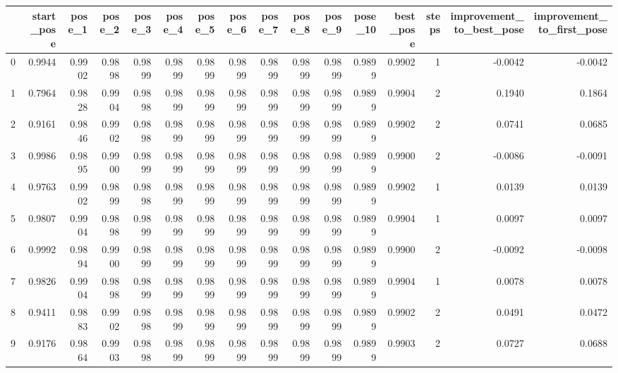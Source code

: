 \begin{tabular}{lrrrrrrrrrrrrrrr}
\toprule
{} &  start\_pose &  pose\_1 &  pose\_2 &  pose\_3 &  pose\_4 &  pose\_5 &  pose\_6 &  pose\_7 &  pose\_8 &  pose\_9 &  pose\_10 &  best\_pose &  steps &  improvement\_to\_best\_pose &  improvement\_to\_first\_pose \\
\midrule
0   &      0.9944 &  0.9902 &  0.9898 &  0.9899 &  0.9899 &  0.9899 &  0.9899 &  0.9899 &  0.9899 &  0.9899 &   0.9899 &     0.9902 &      1 &                   -0.0042 &                    -0.0042 \\
1   &      0.7964 &  0.9828 &  0.9904 &  0.9898 &  0.9899 &  0.9899 &  0.9899 &  0.9899 &  0.9899 &  0.9899 &   0.9899 &     0.9904 &      2 &                    0.1940 &                     0.1864 \\
2   &      0.9161 &  0.9846 &  0.9902 &  0.9898 &  0.9899 &  0.9899 &  0.9899 &  0.9899 &  0.9899 &  0.9899 &   0.9899 &     0.9902 &      2 &                    0.0741 &                     0.0685 \\
3   &      0.9986 &  0.9895 &  0.9900 &  0.9899 &  0.9899 &  0.9899 &  0.9899 &  0.9899 &  0.9899 &  0.9899 &   0.9899 &     0.9900 &      2 &                   -0.0086 &                    -0.0091 \\
4   &      0.9763 &  0.9902 &  0.9899 &  0.9898 &  0.9899 &  0.9899 &  0.9899 &  0.9899 &  0.9899 &  0.9899 &   0.9899 &     0.9902 &      1 &                    0.0139 &                     0.0139 \\
5   &      0.9807 &  0.9904 &  0.9898 &  0.9899 &  0.9899 &  0.9899 &  0.9899 &  0.9899 &  0.9899 &  0.9899 &   0.9899 &     0.9904 &      1 &                    0.0097 &                     0.0097 \\
6   &      0.9992 &  0.9894 &  0.9900 &  0.9899 &  0.9899 &  0.9899 &  0.9899 &  0.9899 &  0.9899 &  0.9899 &   0.9899 &     0.9900 &      2 &                   -0.0092 &                    -0.0098 \\
7   &      0.9826 &  0.9904 &  0.9898 &  0.9899 &  0.9899 &  0.9899 &  0.9899 &  0.9899 &  0.9899 &  0.9899 &   0.9899 &     0.9904 &      1 &                    0.0078 &                     0.0078 \\
8   &      0.9411 &  0.9883 &  0.9902 &  0.9898 &  0.9899 &  0.9899 &  0.9899 &  0.9899 &  0.9899 &  0.9899 &   0.9899 &     0.9902 &      2 &                    0.0491 &                     0.0472 \\
9   &      0.9176 &  0.9864 &  0.9903 &  0.9898 &  0.9899 &  0.9899 &  0.9899 &  0.9899 &  0.9899 &  0.9899 &   0.9899 &     0.9903 &      2 &                    0.0727 &                     0.0688 \\

\end{tabular}
